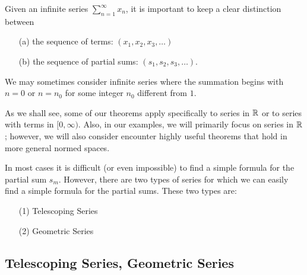 \documentclass[a4paper]{article}
\begin{document}
\begin{remark}[1]
    Given an infinite series \( \sum_{ n=1  }^{ \infty  } {x}_{n}  \), it is important to keep a clear distinction between
    \begin{enumerate}
        \item[(a)] the sequence of terms: \( ({x}_{1}, {x}_{2}, {x}_{3}, \dots ) \)
        \item[(b)] the sequence of partial sums: \( ({s}_{1}, {s}_{2}, {s}_{3}, \dots ) \).
    \end{enumerate}
\end{remark}

\begin{remark}[2]
    We may sometimes consider infinite series where the summation begins with \( n = 0  \) or \( n = {n}_{0} \) for some integer \( {n}_{0}  \) different from \( 1  \).
\end{remark}

As we shall see, some of our theorems apply specifically to series in \( \mathbb{R}  \) or to series with terms in \( [0,\infty) \). Also, in our examples, we will primarily focus on series in \( \mathbb{R}  \); however, we will also consider encounter highly useful theorems that hold in more general normed spaces.  

In most cases it is difficult (or even impossible)  to find a simple formula for the partial sum \( {s}_{m} \). However, there are two types of series for which we can easily find a simple formula for the partial sums. These two types are:
\begin{enumerate}
    \item[(1)] Telescoping Series
    \item[(2)] Geometric Series
\end{enumerate}

\subsection{Telescoping Series, Geometric Series}\label{Telescoping Series, Geometric Series}
\end{document}
